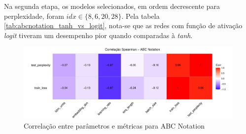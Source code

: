 \documentclass[twoside]{automatextcc}
\begin{document}
Na segunda etapa, os modelos selecionados, em ordem decrescente para perplexidade, foram $idx \in \{8,6,20,28\}$. Pela tabela \ref{tab:abcnotation_tanh_vs_logit}, nota-se que as redes com função de ativação \textit{logit} tiveram um desempenho pior quando comparadas à \textit{tanh}.

\begin{figure}[H]
    \centering
    \includegraphics[width=\textwidth]{abcnotation_tanh_corr.pdf}
    \caption{Correlação entre parâmetros e métricas para ABC Notation}
    \label{fig:abcnotation_tanh_corr}
\end{figure}
\end{document}
